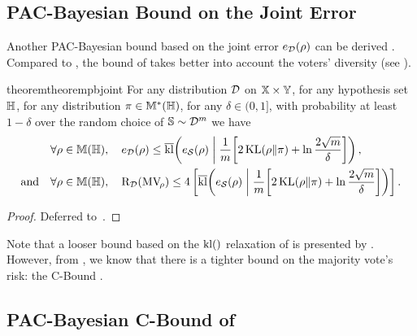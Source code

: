 \subsection{PAC-Bayesian Bound on the Joint Error}

Another PAC-Bayesian bound based on the joint error $e_{\mathcal{D}}(\rho)$ can be derived \citep[Theorem~25]{GermainLacasseLavioletteMarchandRoy2015}.
Compared to , the bound of  takes better into account the voters' diversity (see ).

\begin{restatable}{theorem}{theorempbjoint}\label{chap:mv:theorem:pb-joint-error}
For any distribution $\mathcal{D}$ on $\mathbb{X}\times\mathbb{Y}$, for any hypothesis set $\mathbb{H}$, for any distribution $\pi\in\mathbb{M}^{*}(\mathbb{H})$, for any $\delta\in(0,1]$, with probability at least $1-\delta$ over the random choice of $\mathbb{S}\sim\mathcal{D}^m$ we have
\begin{align*}
&\forall\rho\in\mathbb{M}(\mathbb{H}),\quad e_{\mathcal{D}}(\rho) \le \overline{\operatorname{kl}}\!\left( e_{\mathcal{S}}(\rho) \;\middle|\; \frac{1}{m}\!\left[ 2\operatorname{KL}(\rho\|\pi)+\ln\frac{2\sqrt{m}}{\delta}\right]\right),\\
\text{and}\quad &\forall\rho\in\mathbb{M}(\mathbb{H}),\quad \text{R}_{\mathcal{D}}(\text{MV}_{\!\rho}) \le 4\left[ \overline{\operatorname{kl}}\!\left( e_{\mathcal{S}}(\rho) \;\middle|\; \frac{1}{m}\!\left[ 2\operatorname{KL}(\rho\|\pi)+\ln\frac{2\sqrt{m}}{\delta}\right]\right) \right].
\end{align*}
\end{restatable}
\begin{noaddcontents}\begin{proof}
Deferred to~.
\end{proof}\end{noaddcontents}

Note that a looser bound based on the $\operatorname{kl}()$ relaxation of \citet{ThiemannIgelWintenbergerSeldin2017} is presented by \citet{MasegosaLorenzenIgelSeldin2020}.
However, from , we know that there is a tighter bound on the majority vote's risk: the C-Bound \citep{Breiman2001,LacasseLavioletteMarchandGermainUsunier2006}.

\subsection{PAC-Bayesian C-Bound of \protect\citeauthor{RoyMarchandLaviolette2016}}

